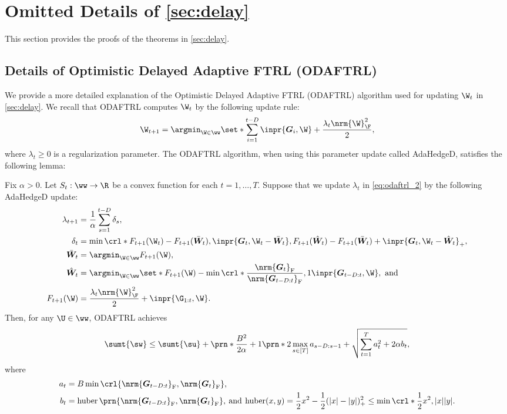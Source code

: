 \section{Omitted Details of \cref{sec:delay}}
\label{app:proof delay}
This section provides the proofs of the theorems in \cref{sec:delay}.

\subsection{Details of Optimistic Delayed Adaptive FTRL (ODAFTRL)}
\label{app:sub_odaftrl}
We provide a more detailed explanation of the Optimistic Delayed Adaptive FTRL (ODAFTRL) algorithm used for updating $\W_t$ in \cref{sec:delay}.
We recall that ODAFTRL computes $\W_t$ by the following update rule:
\begin{equation}
    \label{eq:odaftrl_2}
    \W_{t+1}=\argmin_{\W\in \ww} \set*{ \sum_{i=1}^{t-D} \inpr{\bm{G}_i ,\W} + \frac{\lambda_t \nrm{\W}_{\F}^2 }{2} },
\end{equation}
where $\lambda_t\geq0$ is a regularization parameter.
The ODAFTRL algorithm, when using this parameter update called AdaHedgeD, satisfies the following lemma:
\begin{lemma}
    \label{thm:AdaHedgeD}
    Fix $\alpha>0$. 
    Let $S_t:\ww\to\R$ be a convex function for each $t=1,\dots,T$.
    Suppose that we update $\lambda_{t}$ in \eqref{eq:odaftrl_2} by the following AdaHedgeD update:
    \begin{align*}
        \lambda_{t+1}&=\frac{1}{\alpha}\sum_{s=1}^{t-D}\delta_s,\\
        \delta_t &= \min\crl*{F_{t+1}(\W_t)-F_{t+1}(\bar{\bm{W}}_t),\inpr{ \bm{G}_t,\W_t-\bar{\bm{W}}_t},F_{t+1}(\hat{\bm{W}}_t)-F_{t+1}(\bar{\bm{W}}_t)+\inpr{ \bm{G}_t,\W_t-\hat{\bm{W}}_t}}_+,\\
        \bar{\bm{W}}_t &= \argmin_{\W\in\ww}F_{t+1}(\W),\\
        \hat{\bm{W}}_t&= \argmin_{\W\in\ww}\set*{F_{t+1}(\W)-\min\crl*{\frac{\nrm{\bm{G}_t}_{\mathrm{F}}}{\nrm{\bm{G}_{t-D:t}}_{\mathrm{F}}},1}\inpr{\bm{G}_{t-D:t},\W}}, \text{  and}\\
        F_{t+1}(\W)&=\frac{\lambda_t\nrm{\W}_\F^2}{2}+\inpr{\G_{1:t},\W}.
    \end{align*}
    Then, for any $\U\in\ww$, ODAFTRL achieves
    \begin{equation*}
        \sumt{\sw}
        \leq
        \sumt{\su}
        +
        \prn*{\frac{B^2}{2\alpha}+1}\prn*{2\max_{s\in[T]}a_{s-D:s-1}+\sqrt{\sum_{t=1}^{T}a_{t}^2+2\alpha b_{t}}},
    \end{equation*}
    where 
    \begin{align*}
        a_{t}&=B\min\crl{\nrm{\bm{G}_{t-D:t}}_{\mathrm{F}},\nrm{\bm{G}_t}_{\mathrm{F}}},\\
        b_{t}&=\operatorname{huber}\prn{\nrm{\bm{G}_{t-D:t}}_{\mathrm{F}},\nrm{\bm{G}_t}_{\mathrm{F}}},\:\text{and} \:
        \operatorname{huber}(x,y)=\frac{1}{2}x^2-\frac{1}{2}(|x|-|y|)^2_+\leq\min\crl*{\frac{1}{2}x^2,|x||y|}.
    \end{align*}
\end{lemma}
